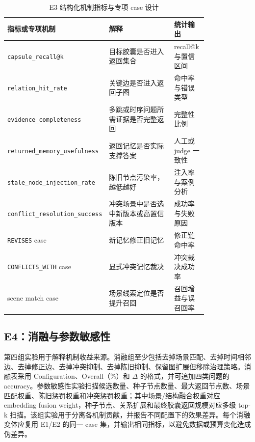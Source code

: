\documentclass[a4paper,fleqn]{cas-sc}
\begin{document}
\begin{CJK*}{UTF8}{gbsn}
\begin{table}[t]
\centering
\scriptsize
\caption{E3 结构化机制指标与专项 case 设计}
\label{tab:e3-metrics}
\setlength{\tabcolsep}{3pt}
\begin{tabular}{P{0.24\linewidth}P{0.40\linewidth}P{0.17\linewidth}}
\toprule
指标或专项机制 & 解释 & 统计输出 \\
\midrule
\texttt{capsule\_recall@k} & 目标胶囊是否进入返回集合 & recall@k 与置信区间 \\
\texttt{relation\_hit\_rate} & 关键边是否进入返回子图 & 命中率与错误类型 \\
\texttt{evidence\_completeness} & 多跳或时序问题所需证据是否完整返回 & 完整性比例 \\
\texttt{returned\_memory\_usefulness} & 返回记忆是否实际支撑答案 & 人工或 judge 一致性 \\
\texttt{stale\_node\_injection\_rate} & 陈旧节点污染率，越低越好 & 注入率与案例分析 \\
\texttt{conflict\_resolution\_success} & 冲突场景中是否选中新版本或高置信版本 & 成功率与失败原因 \\
\texttt{REVISES} case & 新记忆修正旧记忆 & 修正链命中率 \\
\texttt{CONFLICTS\_WITH} case & 显式冲突记忆裁决 & 冲突裁决成功率 \\
scene match case & 场景线索定位是否提升召回 & 召回增益与误召回率 \\
\bottomrule
\end{tabular}
\end{table}

\subsection{E4：消融与参数敏感性}

第四组实验用于解释机制收益来源。消融组至少包括去掉场景匹配、去掉时间相邻边、去掉修正边、去掉冲突抑制、去掉陈旧抑制、保留图扩展但移除治理策略。消融表采用 Configuration、Overall（\%）和 $\Delta$ 的格式，并可追加四类问题的 accuracy。参数敏感性实验扫描候选数量、种子节点数量、最大返回节点数、场景匹配权重、陈旧惩罚权重和冲突惩罚权重；其中场景/结构融合权重对应 embedding fusion weight，种子节点、关系扩展和最终胶囊返回规模对应多级 top-k 扫描。该组实验用于分离各机制贡献，并报告不同配置下的效果差异。每个消融变体应复用 E1/E2 的同一 case 集，并输出相同指标，以避免数据或预算变化造成伪差异。


\end{CJK*}
\end{document}
